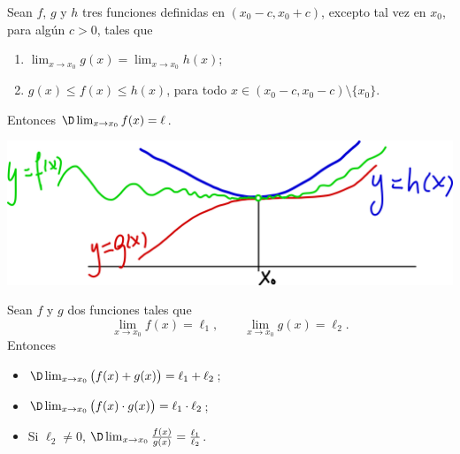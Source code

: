 \begin{theorem}
    Sean $f$, $g$ y $h$ tres funciones definidas en $(x_0-c,x_0+c)$, excepto tal vez en $x_0$, para algún $c>0$, tales que
    \begin{enumerate}
        \item $\lim_{x\to x_0} g(x) = \lim_{x\to x_0} h(x)$;
        \item $g(x)\le f(x) \le h(x)$, para todo $x\in(x_0-c,x_0-c)\setminus\{x_0\}$.
    \end{enumerate}
    Entonces $\D \lim_{x\to x_0} f(x)=\ell$.
\end{theorem}

\centerline{\includegraphics[width=.8\textwidth]{pics/emparedado.png}}


\begin{proposition}
    Sean $f$ y $g$ dos funciones tales que
    \[
    \lim_{x\to x_0} f(x)=\ell_1,
    \qquad
    \lim_{x\to x_0} g(x)=\ell_2.
    \]
    Entonces
    \begin{itemize}
        \item $\D \lim_{x\to x_0} \big( f(x) + g(x) \big) = \ell_1 + \ell_2$;
        \item $\D \lim_{x\to x_0} \big( f(x) \cdot g(x) \big) = \ell_1 \cdot \ell_2$;
        \item Si $\ell_2\neq 0$, $\D \lim_{x\to x_0} \frac{f(x)}{g(x)} = \frac{\ell_1}{\ell_2}$.
    \end{itemize}
\end{proposition}

